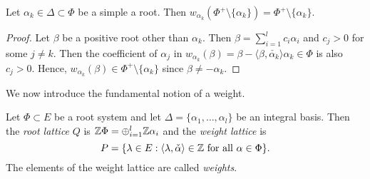 \begin{lemma}\label{lem:simplereflection}
    Let $\alpha_k\in\Delta\subset\Phi$ be a simple a root. Then $w_{\alpha_k}(\Phi^+\setminus\{\alpha_k\})=\Phi^+\setminus\{\alpha_k\}$.
\end{lemma}

\begin{proof}
    Let $\beta$ be a positive root other than $\alpha_k$. Then $\beta=\sum_{i=1}^{l}c_i\alpha_i$ and $c_j> 0$ for some $j\neq k$. Then the coefficient of $\alpha_j$ in $w_{\alpha_k}(\beta)=\beta-\langle\beta,\check{\alpha_k}\rangle\alpha_k\in\Phi$ is also $c_j>0$. Hence, $w_{\alpha_k}(\beta)\in\Phi^+\setminus\{\alpha_k\}$ since $\beta\neq-\alpha_k$.
\end{proof}

We now introduce the fundamental notion of a weight.

\begin{definition}
    Let $\Phi\subset E$ be a root system and let $\Delta=\{\alpha_1,\ldots,\alpha_l\}$ be an integral basis. Then the \textit{root lattice} $Q$ is $\mathbb{Z}\Phi=\oplus_{i=1}^l\mathbb{Z}\alpha_i$ and the \textit{weight lattice} is 
    $$P=\{\lambda\in E:\langle\lambda,\check{\alpha}\rangle\in\mathbb{Z}\text{ for all }\alpha\in\Phi\}.$$
    The elements of the weight lattice are called \textit{weights}.
\end{definition}

